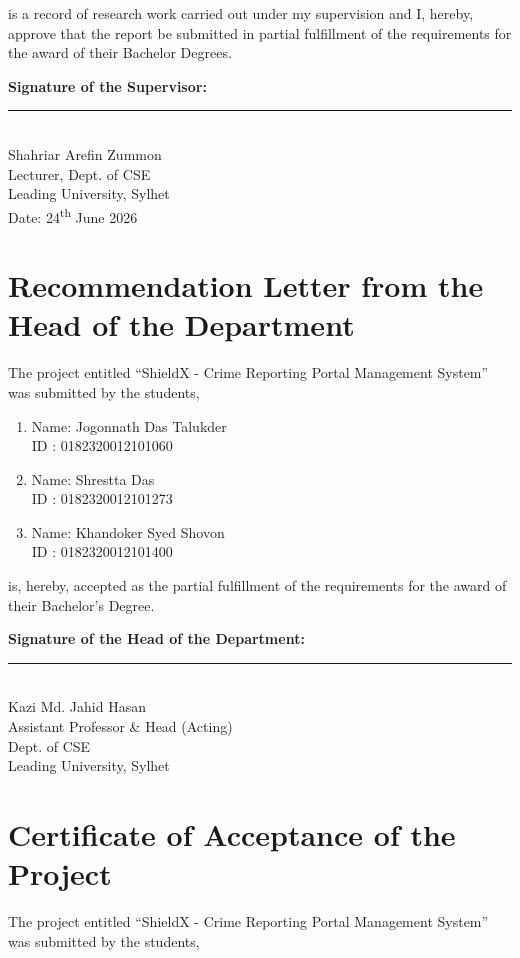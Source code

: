 \documentclass[12pt, a4paper, twoside]{report}
\begin{document}
is a record of research work carried out under my supervision and I, hereby, approve that the report be submitted in partial fulfillment of the requirements for the award of their Bachelor Degrees.
\vspace{2cm}

\noindent\textbf{Signature of the Supervisor:}\\[1.5cm]
\noindent\rule{6cm}{0.4pt}\\
Shahriar Arefin Zummon\\
Lecturer, Dept. of CSE\\
Leading University, Sylhet\\
Date: 24\textsuperscript{th} June 2026

\clearpage

\chapter*{Recommendation Letter from the Head of the Department}
The project entitled ``ShieldX - Crime Reporting Portal Management System'' was submitted by the students,

\begin{enumerate}[label=\arabic*., start=4]
    \item Name: Jogonnath Das Talukder\\
          ID : 0182320012101060
    \item Name: Shrestta Das\\
          ID : 0182320012101273
    \item Name: Khandoker Syed Shovon\\
          ID : 0182320012101400
\end{enumerate}

is, hereby, accepted as the partial fulfillment of the requirements for the award of their Bachelor's Degree.
\vspace{2cm}

\noindent\textbf{Signature of the Head of the Department:}\\[1.5cm]
\noindent\rule{6cm}{0.4pt}\\
Kazi Md. Jahid Hasan\\
Assistant Professor \& Head (Acting)\\
Dept. of CSE\\
Leading University, Sylhet

\clearpage

\chapter*{Certificate of Acceptance of the Project}
The project entitled ``ShieldX - Crime Reporting Portal Management System'' was submitted by the students,
\end{document}
